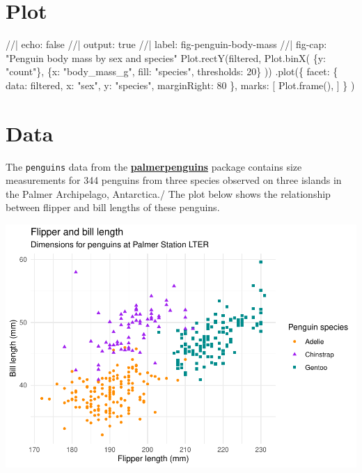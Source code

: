 \documentclass[
  a4paper,
]{scrbook}
\newenvironment{Shaded}{}{}
\newcommand{\NormalTok}[1]{\textcolor[rgb]{0.14,0.16,0.18}{#1}}
\begin{document}
\hypertarget{plot}{%
\section{Plot}\label{plot}}

\begin{Shaded}
\begin{Highlighting}[numbers=left,,]
\NormalTok{//| echo: false}
\NormalTok{//| output: true}
\NormalTok{//| label: fig{-}penguin{-}body{-}mass}
\NormalTok{//| fig{-}cap: "Penguin body mass by sex and species"}
\NormalTok{Plot.rectY(filtered, }
\NormalTok{  Plot.binX(}
\NormalTok{    \{y: "count"\}, }
\NormalTok{    \{x: "body\_mass\_g", fill: "species", thresholds: 20\}}
\NormalTok{  ))}
\NormalTok{  .plot(\{}
\NormalTok{    facet: \{}
\NormalTok{      data: filtered,}
\NormalTok{      x: "sex",}
\NormalTok{      y: "species",}
\NormalTok{      marginRight: 80}
\NormalTok{    \},}
\NormalTok{    marks: [}
\NormalTok{      Plot.frame(),}
\NormalTok{    ]}
\NormalTok{  \}}
\NormalTok{)}
\end{Highlighting}
\end{Shaded}

\hypertarget{data}{%
\section{Data}\label{data}}

The \texttt{penguins} data from the
\href{https://allisonhorst.github.io/palmerpenguins}{\textbf{palmerpenguins}}
package contains size measurements for 344 penguins from three species
observed on three islands in the Palmer Archipelago, Antarctica./ The
plot below shows the relationship between flipper and bill lengths of
these penguins.

\includegraphics{./part1_files/figure-pdf/plot-penguins-1.pdf}
\end{document}
